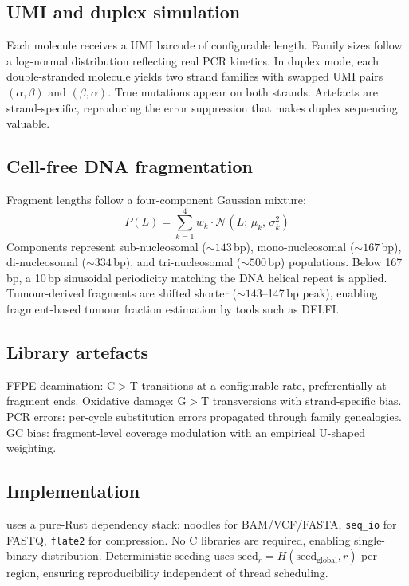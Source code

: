 \subsection{UMI and duplex simulation}

Each molecule receives a UMI barcode of configurable length.
Family sizes follow a log-normal distribution reflecting real PCR kinetics.
In duplex mode\autocite{schmitt2012duplex}, each double-stranded molecule yields two strand families with swapped UMI pairs $(\alpha,\beta)$ and $(\beta,\alpha)$.
True mutations appear on both strands.
Artefacts are strand-specific, reproducing the error suppression that makes duplex sequencing valuable.

\subsection{Cell-free DNA fragmentation}
\label{sec:cfdna}

Fragment lengths follow a four-component Gaussian mixture:
\begin{equation}
  P(L) = \sum_{k=1}^{4} w_k \cdot \mathcal{N}(L;\, \mu_k,\, \sigma_k^2)
  \label{eq:cfdna}
\end{equation}
Components represent sub-nucleosomal (${\sim}143$\,bp), mono-nucleosomal (${\sim}167$\,bp), di-nucleosomal (${\sim}334$\,bp), and tri-nucleosomal (${\sim}500$\,bp) populations.
Below 167\,bp, a 10\,bp sinusoidal periodicity matching the DNA helical repeat is applied\autocite{snyder2016cfdna_nucleosome}.
Tumour-derived fragments are shifted shorter (${\sim}143$--147\,bp peak)\autocite{lo2010cfdna}, enabling fragment-based tumour fraction estimation by tools such as DELFI.

\subsection{Library artefacts}

FFPE deamination: C$>$T transitions at a configurable rate, preferentially at fragment ends.
Oxidative damage: G$>$T transversions with strand-specific bias.
PCR errors: per-cycle substitution errors propagated through family genealogies.
GC bias: fragment-level coverage modulation with an empirical U-shaped weighting.

\subsection{Implementation}

\varforge{} uses a pure-Rust dependency stack: noodles\autocite{noodles} for BAM/VCF/FASTA, \texttt{seq\_io} for FASTQ, \texttt{flate2} for compression.
No C libraries are required, enabling single-binary distribution.
Deterministic seeding uses $\text{seed}_r = H(\text{seed}_\text{global}, r)$ per region, ensuring reproducibility independent of thread scheduling.

